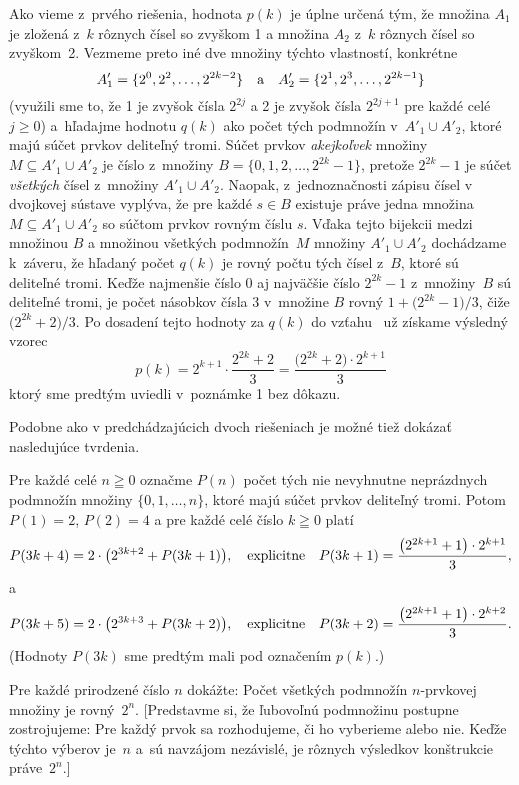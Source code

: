 {Ako vieme z~prvého riešenia, hodnota $p(k)$ je úplne určená tým,
že množina $A_1$ je zložená z~$k$ rôznych čísel so zvyškom 1
a množina $A_2$ z~$k$ rôznych čísel so zvyškom~2. Vezmeme preto
iné dve množiny týchto vlastností, konkrétne
$$
A'_1=\{2^0,2^2,\dots,2^{2k-2}\}\quad\hbox{a}\quad
A'_2=\{2^1,2^3,\dots,2^{2k-1}\}
$$
(využili sme to, že 1 je zvyšok čísla $2^{2j}$ a 2 je zvyšok
čísla $2^{2j+1}$ pre každé celé $j\geq0$) a~hľadajme hodnotu $q(k)$
ako počet tých podmnožín v~$A'_1\cup A'_2$, ktoré majú
súčet prvkov deliteľný tromi. Súčet prvkov {\it akejkoľvek\/}
množiny $M\subseteq A'_1\cup A'_2$ je číslo z~množiny
$B=\{0,1,2,\dots, 2^{2k}-1\}$, pretože $2^{2k}-1$ je súčet {\it
všetkých\/}
čísel z~množiny $A'_1\cup A'_2$.
Naopak, z~jednoznačnosti zápisu čísel
v dvojkovej sústave vyplýva, že pre každé $s\in B$ existuje práve jedna
množina $M\subseteq A'_1\cup A'_2$ so súčtom prvkov rovným
číslu $s$. Vďaka tejto bijekcii
medzi množinou $B$ a množinou všetkých
podmnožín~$M$ množiny $A'_1\cup A'_2$ dochádzame k~záveru, že
hľadaný počet $q(k)$ je rovný počtu tých čísel z~$B$, ktoré sú
deliteľné tromi. Keďže najmenšie číslo 0 aj najväčšie číslo $2^{2k}-1$
z~množiny~$B$ sú deliteľné tromi, je počet násobkov čísla 3
v~množine $B$ rovný $1+\bigl(2^{2k}-1\bigr)/3$, čiže
${\bigl(2^{2k}+2\bigr)}/3$. Po dosadení tejto hodnoty za $q(k)$ do
vzťahu~ už získame výsledný vzorec
$$
p(k)=2^{k+1}\cdot\frac{2^{2k}+2}{3}=
\frac{\bigl(2^{2k}+2\bigr)\cdot2^{k+1}}{3}
$$
ktorý sme predtým uviedli v~poznámke 1 bez dôkazu.

\poznamka
Podobne ako v predchádzajúcich dvoch riešeniach je možné tiež
dokázať nasledujúce tvrdenia.

Pre každé celé $n\geqq0$ označme $P(n)$ počet tých nie nevyhnutne
neprázdnych podmnožín množiny $\{0,1,\ldots,n\}$,
ktoré majú súčet prvkov deliteľný tromi. Potom
$P(1)=2$, $P(2)=4$ a pre každé celé
číslo $k\geqq0$ platí
$$
P(3k+4)=2\cdot\bigl(2^{3k+2}+P(3k+1)\bigr),\quad\hbox{explicitne}\quad
P(3k+1) = \frac{\bigl(2^{2k+1}+1\bigr)\cdot 2^{k+1}}{3},
$$
a
$$
P(3k+5)=2\cdot\bigl(2^{3k+3}+P(3k+2)\bigr),\quad\hbox{explicitne}\quad
P(3k+2)=\frac{\bigl(2^{2k+1}+1\bigr)\cdot 2^{k+2}}{3}.
$$
(Hodnoty $P(3k)$ sme predtým mali pod označením $p(k)$.)

Pre každé prirodzené číslo $n$ dokážte: Počet všetkých
podmnožín $n$-prvkovej množiny je rovný~$2^n$.
[Predstavme si, že ľubovoľnú podmnožinu postupne
zostrojujeme: Pre každý prvok sa rozhodujeme, či ho vyberieme alebo nie.
Keďže týchto výberov je~$n$ a~sú navzájom nezávislé,
je rôznych výsledkov konštrukcie práve~$2^n$.]

}
